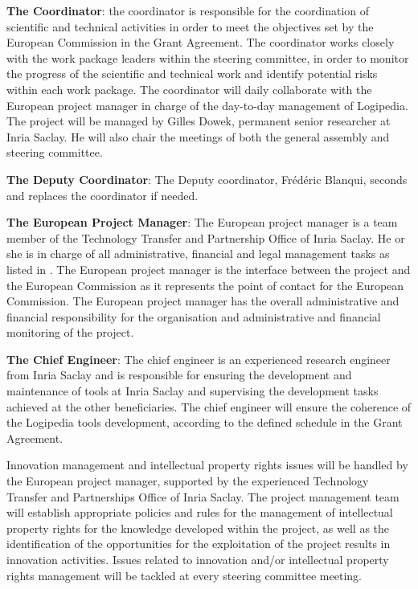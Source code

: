 \begin{compactitem}
\item{\bf The Coordinator}: the 
coordinator is responsible for the coordination of
scientific and technical activities in order to meet the objectives
set by the European Commission in the Grant Agreement. The 
coordinator works closely with the work package leaders
within the steering committee, in order to monitor the progress of the
scientific and technical work and identify potential risks within each
work package. The coordinator will daily
collaborate with the European project manager in charge of the
day-to-day management of Logipedia. The project will be managed by
Gilles Dowek, permanent senior researcher at Inria Saclay. He will
also chair the meetings of both the general assembly and steering
committee.

\item{\bf The Deputy Coordinator}: The Deputy coordinator, Frédéric
Blanqui, seconds and replaces the coordinator if needed.

\item{\bf The European Project Manager}: The European project manager
  is a team member of the Technology Transfer and Partnership Office
  of Inria Saclay. He or she is in charge of all administrative,
  financial and legal management tasks as listed in
  . The European project manager is the interface
  between the project and the European Commission as it represents the
  point of contact for the European Commission. The European project
  manager has the overall administrative and financial responsibility
  for the organisation and administrative and financial monitoring of
  the project.

\item{\bf The Chief Engineer}: The chief engineer is an experienced
research engineer from Inria Saclay and is responsible for ensuring
the development and maintenance of tools at Inria Saclay and
supervising the development tasks achieved at the other
beneficiaries. The chief engineer will ensure the coherence of the
Logipedia tools development, according to the defined schedule in the
Grant Agreement.
\end{compactitem}

Innovation management and intellectual property rights issues will be
handled by the European project manager, supported by the experienced
Technology Transfer and Partnerships Office of Inria Saclay. The
project management team will establish appropriate policies and rules
for the management of intellectual property rights for the knowledge
developed within the project, as well as the identification of the
opportunities for the exploitation of the project results in
innovation activities. Issues related to innovation and/or
intellectual property rights management will be tackled at every
steering committee meeting.

